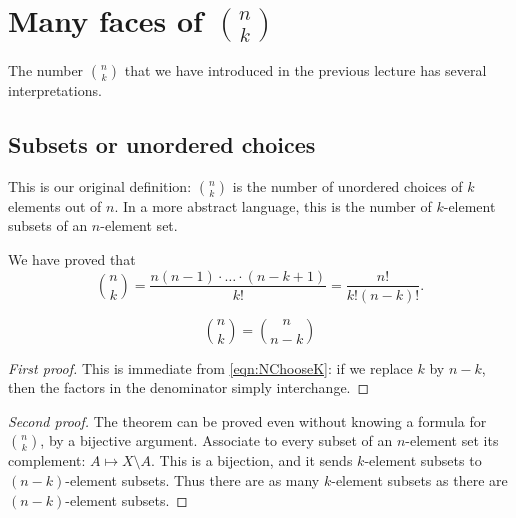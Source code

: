 \begin{page}
\setcounter{section}{3}
\setcounter{subsection}{1}
\setcounter{dfn}{0}
\label{portion:58}

\section{Many faces of $\binom{n}{k}$}
The number $\binom{n}{k}$ that we have introduced in the previous lecture has several interpretations.

\end{page}

\begin{page}
\setcounter{section}{3}
\setcounter{subsection}{1}
\setcounter{dfn}{0}
\label{portion:59}

\subsection{Subsets or unordered choices}
This is our original definition: $\binom{n}{k}$ is the number of unordered choices of $k$ elements out of $n$.
In a more abstract language, this is the number of $k$-element subsets of an $n$-element set.

We have proved that
\begin{equation}
\label{eqn:NChooseK}
\binom{n}{k} = \frac{n(n-1)\cdot \ldots \cdot (n-k+1)}{k!} = \frac{n!}{k!(n-k)!}.
\end{equation}


\end{page}

\begin{page}
\setcounter{section}{3}
\setcounter{subsection}{1}
\setcounter{dfn}{1}
\label{portion:61}

\begin{thm}
\[
\binom{n}{k} = \binom{n}{n-k}
\]
\end{thm}

\end{page}

\begin{page}
\setcounter{section}{3}
\setcounter{subsection}{1}
\setcounter{dfn}{1}
\label{portion:62}

\begin{proof}[First proof]
This is immediate from \eqref{eqn:NChooseK}: if we replace $k$ by $n-k$, then the factors in the denominator simply interchange.
\end{proof}
\begin{proof}[Second proof]
The theorem can be proved even without knowing a formula for $\binom{n}{k}$, by a bijective argument.
Associate to every subset of an $n$-element set its complement: $A \mapsto X \setminus A$.
This is a bijection, and it sends $k$-element subsets to $(n-k)$-element subsets.
Thus there are as many $k$-element subsets as there are $(n-k)$-element subsets.
\end{proof}


\end{page}

